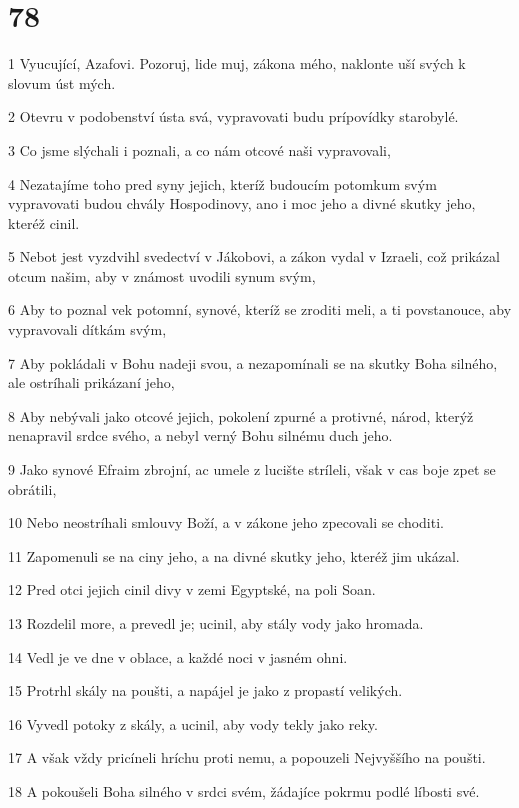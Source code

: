 \chapter{78}

\par 1 Vyucující, Azafovi. Pozoruj, lide muj, zákona mého, naklonte uší svých k slovum úst mých.
\par 2 Otevru v podobenství ústa svá, vypravovati budu prípovídky starobylé.
\par 3 Co jsme slýchali i poznali, a co nám otcové naši vypravovali,
\par 4 Nezatajíme toho pred syny jejich, kteríž budoucím potomkum svým vypravovati budou chvály Hospodinovy, ano i moc jeho a divné skutky jeho, kteréž cinil.
\par 5 Nebot jest vyzdvihl svedectví v Jákobovi, a zákon vydal v Izraeli, což prikázal otcum našim, aby v známost uvodili synum svým,
\par 6 Aby to poznal vek potomní, synové, kteríž se zroditi meli, a ti povstanouce, aby vypravovali dítkám svým,
\par 7 Aby pokládali v Bohu nadeji svou, a nezapomínali se na skutky Boha silného, ale ostríhali prikázaní jeho,
\par 8 Aby nebývali jako otcové jejich, pokolení zpurné a protivné, národ, kterýž nenapravil srdce svého, a nebyl verný Bohu silnému duch jeho.
\par 9 Jako synové Efraim zbrojní, ac umele z lucište stríleli, však v cas boje zpet se obrátili,
\par 10 Nebo neostríhali smlouvy Boží, a v zákone jeho zpecovali se choditi.
\par 11 Zapomenuli se na ciny jeho, a na divné skutky jeho, kteréž jim ukázal.
\par 12 Pred otci jejich cinil divy v zemi Egyptské, na poli Soan.
\par 13 Rozdelil more, a prevedl je; ucinil, aby stály vody jako hromada.
\par 14 Vedl je ve dne v oblace, a každé noci v jasném ohni.
\par 15 Protrhl skály na poušti, a napájel je jako z propastí velikých.
\par 16 Vyvedl potoky z skály, a ucinil, aby vody tekly jako reky.
\par 17 A však vždy pricíneli hríchu proti nemu, a popouzeli Nejvyššího na poušti.
\par 18 A pokoušeli Boha silného v srdci svém, žádajíce pokrmu podlé líbosti své.

